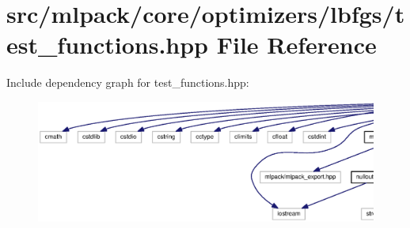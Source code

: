 \section{src/mlpack/core/optimizers/lbfgs/test\+\_\+functions.hpp File Reference}
\label{test__functions_8hpp}
Include dependency graph for test\+\_\+functions.\+hpp\+:
\nopagebreak
\begin{figure}[H]
\begin{center}
\leavevmode
\includegraphics[width=350pt]{test__functions_8hpp__incl}
\end{center}
\end{figure}
